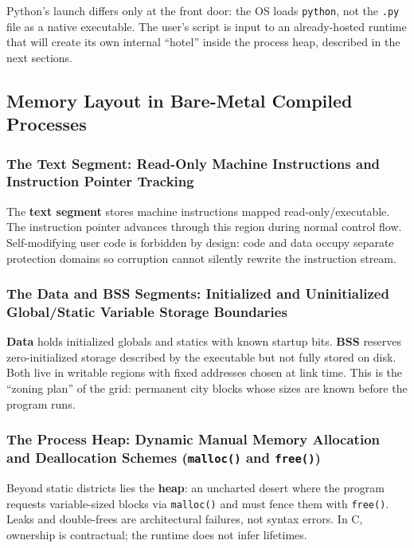 \documentclass[a4paper,twoside]{report}
\begin{document}
Python's launch differs only at the front door: the OS loads \texttt{python}, not the \texttt{.py} file as a native executable. The user's script is input to an already-hosted runtime that will create its own internal ``hotel'' inside the process heap, described in the next sections.


\subsection{Memory Layout in Bare-Metal Compiled Processes}

\subsubsection{The Text Segment: Read-Only Machine Instructions and Instruction Pointer Tracking}

The \textbf{text segment} stores machine instructions mapped read-only/executable. The instruction pointer advances through this region during normal control flow. Self-modifying user code is forbidden by design: code and data occupy separate protection domains so corruption cannot silently rewrite the instruction stream.

\subsubsection{The Data and BSS Segments: Initialized and Uninitialized Global/Static Variable Storage Boundaries}

\textbf{Data} holds initialized globals and statics with known startup bits. \textbf{BSS} reserves zero-initialized storage described by the executable but not fully stored on disk. Both live in writable regions with fixed addresses chosen at link time. This is the ``zoning plan'' of the grid: permanent city blocks whose sizes are known before the program runs.

\subsubsection{The Process Heap: Dynamic Manual Memory Allocation and Deallocation Schemes (\texttt{malloc()} and \texttt{free()})}

Beyond static districts lies the \textbf{heap}: an uncharted desert where the program requests variable-sized blocks via \texttt{malloc()} and must fence them with \texttt{free()}. Leaks and double-frees are architectural failures, not syntax errors. In C, ownership is contractual; the runtime does not infer lifetimes.
\end{document}
